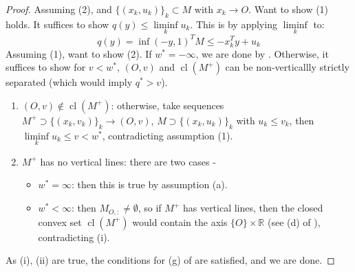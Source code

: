 \begin{proof}
	Assuming (2), and $\{(x_k,u_k)\}_{k}\subset M$ with $x_k\to O$. Want to show (1) holds. It suffices to show $q(y)\leq \underset{k}{\operatorname{liminf}}u_k$. This is by applying $\underset{k}{\operatorname{liminf}}$ to:
	\[
		q(y)=\inf (-y,1)^TM \leq -x_k^Ty+u_k
	\]
	Assuming (1), want to show (2). If $w^\ast=-\infty$, we are done by . Otherwise, it suffices to show for $v<w^\ast$, $(O,v)$ and $\operatorname{cl}(M^+)$ can be non-verticallly strictly separated (which would imply $q^\ast >v$).
	\begin{enumerate}[label=(\roman*)]
		\item $(O,v)\notin \operatorname{cl}(M^+)$: otherwise, take sequences $M^+\supset\{(x_k,v_k)\}_{k}\to (O,v)$, $M\supset \{(x_k,u_k)\}_{k}$ with $u_k\leq v_k$, then $\underset{k}{\operatorname{liminf}}u_k\leq v<w^\ast$, contradicting assumption (1).
		\item $M^+$ has no vertical lines: there are two cases -
		      \begin{itemize}
			      \item $w^\ast=\infty$: then this is true by assumption (a).
			      \item $w^\ast<\infty$: then $M_{O,:}\neq\emptyset$, so if $M^+$ has vertical lines, then the closed convex set $\operatorname{cl}(M^+)$ would contain the axis $\{O\}\times \mathbb{R}$ (see (d) of ), contradicting (i).
		      \end{itemize}
	\end{enumerate}
	As (i), (ii) are true, the conditions for (g) of  are satisfied, and we are done.
\end{proof}

